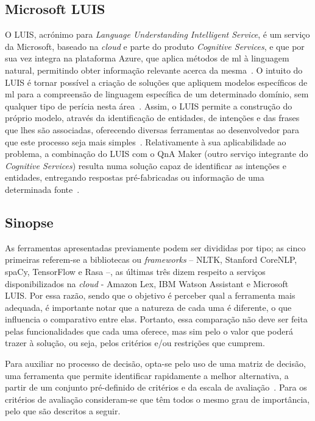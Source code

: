 \subsection{Microsoft LUIS}
O LUIS, acrónimo para \textit{Language Understanding Intelligent Service}, é um serviço da Microsoft, baseado na \textit{cloud} e parte do produto \textit{Cognitive Services}, e que por sua vez integra na plataforma Azure, que aplica métodos de \gls{ml} à linguagem natural, permitindo obter informação relevante acerca da mesma~\parencite{microsoft_luis_official}. O intuito do LUIS é tornar possível a criação de soluções que apliquem modelos específicos de \gls{ml} para a compreensão de linguagem específica de um determinado domínio, sem qualquer tipo de perícia nesta área~\parencite{luis_fast_easy_language_understanding}. Assim, o LUIS permite a construção do próprio modelo, através da identificação de entidades, de intenções e das frases que lhes são associadas, oferecendo diversas ferramentas ao desenvolvedor para que este processo seja mais simples~\parencite{microsoft_luis_official}. Relativamente à sua aplicabilidade ao problema, a combinação do LUIS com o QnA Maker (outro serviço integrante do \textit{Cognitive Services}) resulta numa solução capaz de identificar as intenções e entidades, entregando respostas pré-fabricadas ou informação de uma determinada fonte~\parencite{microsoft_luis_use_nl_processing_service}.

\subsection{Sinopse}
As ferramentas apresentadas previamente podem ser divididas por tipo; as cinco primeiras referem-se a bibliotecas ou \textit{frameworks} -- NLTK, Stanford CoreNLP, spaCy, TensorFlow e Rasa --, as últimas três dizem respeito a serviços disponibilizados na \textit{cloud} - Amazon Lex, IBM Watson Assistant e Microsoft LUIS. Por essa razão, sendo que o objetivo é perceber qual a ferramenta mais adequada, é importante notar que a natureza de cada uma é diferente, o que influencia o comparativo entre elas. Portanto, essa comparação não deve ser feita pelas funcionalidades que cada uma oferece, mas sim pelo o valor que poderá trazer à solução, ou seja, pelos critérios e/ou restrições que cumprem.

Para auxiliar no processo de decisão, opta-se pelo uso de uma matriz de decisão, uma ferramenta que permite identificar rapidamente a melhor alternativa, a partir de um conjunto pré-definido de critérios e da escala de avaliação~\parencite{decisions_engineering_design}.
Para os critérios de avaliação consideram-se que têm todos o mesmo grau de importância, pelo que são descritos a seguir.

